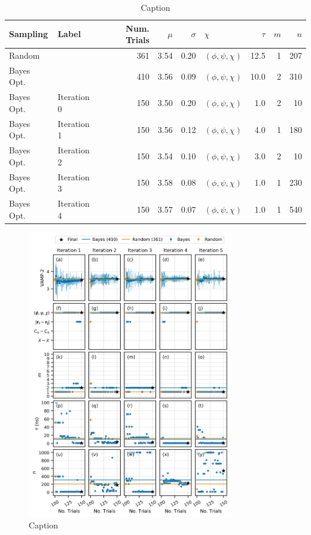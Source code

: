 \begin{table}
    \centering
    \begin{tabular}{|l|l|r|r|r|l|r|r|r|}
    \hline
       Sampling &        Label &  Num. Trials & $\mu$ & $\sigma$ &                $\chi$ & $\tau$ & $m$ & $n$ \\
    \hline\hline
         Random &              & 361 &  3.54 & 0.20 &  $(\phi, \psi, \chi)$ &   12.5 &   1 & 207 \\
     Bayes Opt. &              &410 &  3.56 & 0.09 &  $(\phi, \psi, \chi)$ &   10.0 &   2 & 310 \\
     Bayes Opt. &  Iteration 0 &150 &  3.50 & 0.20 &  $(\phi, \psi, \chi)$ &    1.0 &   2 &  10 \\
     Bayes Opt. &  Iteration 1 &150 &  3.56 & 0.12 &  $(\phi, \psi, \chi)$ &    4.0 &   1 & 180 \\
     Bayes Opt. &  Iteration 2 &150 &  3.54 & 0.10 &  $(\phi, \psi, \chi)$ &    3.0 &   2 &  10 \\
     Bayes Opt. &  Iteration 3 &150 &  3.58 & 0.08 &  $(\phi, \psi, \chi)$ &    1.0 &   1 & 230 \\
     Bayes Opt. &  Iteration 4 &150 &  3.57 & 0.07 &  $(\phi, \psi, \chi)$ &    1.0 &   1 & 540 \\
    \hline
    \end{tabular}
    \caption{Caption}
    \label{tab:aadh_opt_results}
\end{table}

\begin{figure}
    \centering
    \includegraphics[width=0.8\textwidth]{chapters/msm_optimization/figures/aadh_opt_traj_act_s_d.png}
    \caption{Caption}
    \label{fig:aadh_opt_traj_d}
\end{figure}

